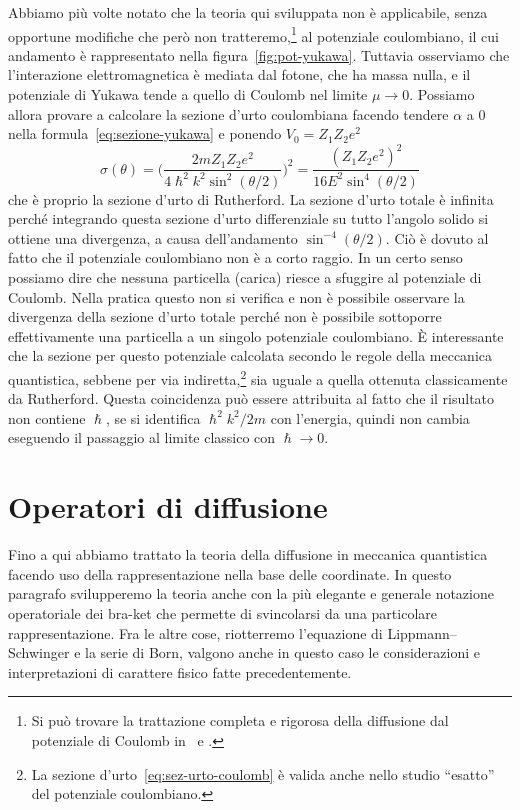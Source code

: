 \documentclass[a4paper,fleqn,twoside,12pt]{article}
\begin{document}
Abbiamo più volte notato che la teoria qui sviluppata non è applicabile, senza
opportune modifiche che però non
tratteremo,\footnote{Si può trovare la trattazione completa e rigorosa della
  diffusione dal potenziale di Coulomb
  in~\textcite[368-373]{gottfried:quantum-mechanics} e
  \textcites[655-659]{landau:meccanica-quantistica}.}
al potenziale coulombiano, il cui andamento è rappresentato nella
figura~\ref{fig:pot-yukawa}.  Tuttavia osserviamo che l'interazione
elettromagnetica è mediata dal fotone, che ha massa nulla, e il potenziale di
Yukawa tende a quello di Coulomb nel limite $\mu \to 0$.  Possiamo allora
provare a calcolare la sezione d'urto coulombiana facendo tendere $\alpha$ a $0$
nella formula~\eqref{eq:sezione-yukawa} e ponendo $V_{0} = Z_{1}Z_{2}e^{2}$
\begin{equation}
  \label{eq:sez-urto-coulomb}
  \sigma(\theta) =
  \bigg(\frac{2mZ_{1}Z_{2}e^{2}}{4\hslash^{2}k^{2}\sin^{2}(\theta/2)}\bigg)^{2}=
  \frac{(Z_{1}Z_{2}e^{2})^{2}}{16E^{2}\sin^{4}(\theta/2)}
\end{equation}
che è proprio la sezione d'urto di Rutherford.  La sezione d'urto totale è
infinita perché integrando questa sezione d'urto differenziale su tutto l'angolo
solido si ottiene una divergenza, a causa dell'andamento $\sin^{-4}(\theta/2)$.
Ciò è dovuto al fatto che il potenziale coulombiano non è a corto raggio.  In un
certo senso possiamo dire che nessuna particella (carica) riesce a sfuggire al
potenziale di Coulomb.  Nella pratica questo non si verifica e non è possibile
osservare la divergenza della sezione d'urto totale perché non è possibile
sottoporre effettivamente una particella a un singolo potenziale coulombiano.  È
interessante che la sezione per questo potenziale calcolata secondo le regole
della meccanica quantistica, sebbene per via
indiretta,\footnote{La sezione d'urto~\eqref{eq:sez-urto-coulomb} è valida anche
  nello studio ``esatto'' del potenziale coulombiano.}
sia uguale a quella ottenuta classicamente da Rutherford.  Questa coincidenza
può essere attribuita al fatto che il risultato non contiene $\hslash$, se si
identifica $\hslash^{2}k^{2}/2m$ con l'energia, quindi non cambia eseguendo il
passaggio al limite classico con $\hslash \to 0$.

\section{Operatori di diffusione}
\label{sec:operatori-diffusione}

Fino a qui abbiamo trattato la teoria della diffusione in meccanica quantistica
facendo uso della rappresentazione nella base delle coordinate.  In questo
paragrafo svilupperemo la teoria anche con la più elegante e generale notazione
operatoriale dei bra-ket che permette di svincolarsi da una particolare
rappresentazione.  Fra le altre cose, riotterremo l'equazione di
Lippmann–Schwinger e la serie di Born, valgono anche in questo caso le
considerazioni e interpretazioni di carattere fisico fatte precedentemente.
\end{document}

